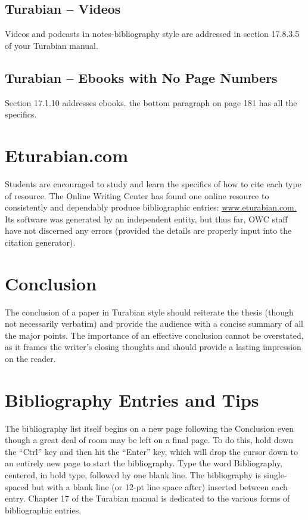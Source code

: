 \documentclass[raggedright]{turabian-researchpaper}
\newcommand*{\bluehref}[2]{\href{#1}{\color{blue}\ul{#2}}}
\begin{document}
\subsection{Turabian -- Videos}

Videos and podcasts in notes-bibliography style are addressed in section
17.8.3.5 of your Turabian manual.\autocite[204]{Turabian}

\subsection{Turabian -- Ebooks with No Page Numbers}

Section 17.1.10 addresses ebooks. the bottom paragraph on page 181 has all the
specifics.\autocite[181]{Turabian}

\section[eTurabian.com]{Eturabian.com}

Students are encouraged to study and learn the specifics of how to cite each
type of resource. The Online Writing Center has found one online resource to
consistently and dependably produce bibliographic entries:
\bluehref{http://www.eturabian.com/}{www.eturabian.com.} Its software was
generated by an independent entity, but thus far, OWC staff have not discerned
any errors (provided the details are properly input into the citation
generator).

\section{Conclusion}

The conclusion of a paper in Turabian style should reiterate the thesis (though
not necessarily verbatim) and provide the audience with a concise summary of all
the major points. The importance of an effective conclusion cannot be
overstated, as it frames the writer's closing thoughts and should provide a
lasting impression on the reader.

\section{Bibliography Entries and Tips}

The bibliography list itself begins on a new page following the Conclusion even
though a great deal of room may be left on a final page. To do this, hold down
the ``Ctrl'' key and then hit the ``Enter'' key, which will drop the cursor down
to an entirely new page to start the bibliography. Type the word Bibliography,
centered, in bold type, followed by one blank line. The bibliography is
single-spaced but with a blank line (or 12-pt line space after) inserted between
each entry. Chapter 17 of the Turabian manual is dedicated to the various forms
of bibliographic entries.\autocite[164-215]{Turabian}
\end{document}
